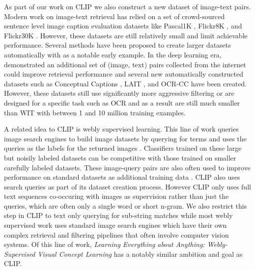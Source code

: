 As part of our work on CLIP we also construct a new dataset of image-text pairs. Modern work on image-text retrieval has relied on a set of crowd-sourced sentence level image caption evaluation datasets like Pascal1K \citep{rashtchian2010collecting}, Flickr8K \citep{hodosh2013framing}, and Flickr30K \citep{young2014image}. However, these datasets are still relatively small and limit achievable performance. Several methods have been proposed to create larger datasets automatically with \citet{ordonez2011im2text} as a notable early example. In the deep learning era, \citet{mithun2018webly} demonstrated an additional set of (image, text) pairs collected from the internet could improve retrieval performance and several new automatically constructed datasets such as Conceptual Captions \citep{sharma2018conceptual}, LAIT \citep{qi2020imagebert}, and OCR-CC \citep{yang2020tap} have been created. However, these datasets still use significantly more aggressive filtering or are designed for a specific task such as OCR and as a result are still much smaller than WIT with between 1 and 10 million training examples.

A related idea to CLIP is webly supervised learning. This line of work queries image search engines to build image datasets by querying for terms and uses the queries as the labels for the returned images \citep{fergus2005learning}. Classifiers trained on these large but noisily labeled datasets can be competitive with those trained on smaller carefully labeled datasets. These image-query pairs are also often used to improve performance on standard datasets as additional training data \citep{chen2015webly}. CLIP also uses search queries as part of its dataset creation process. However CLIP only uses full text sequences co-occuring with images as supervision rather than just the queries, which are often only a single word or short n-gram. We also restrict this step in CLIP to text only querying for sub-string matches while most webly supervised work uses standard image search engines which have their own complex retrieval and filtering pipelines that often involve computer vision systems. Of this line of work, \textit{Learning Everything about Anything: Webly-Supervised Visual Concept Learning} \citep{divvala2014learning} has a notably similar ambition and goal as CLIP.


